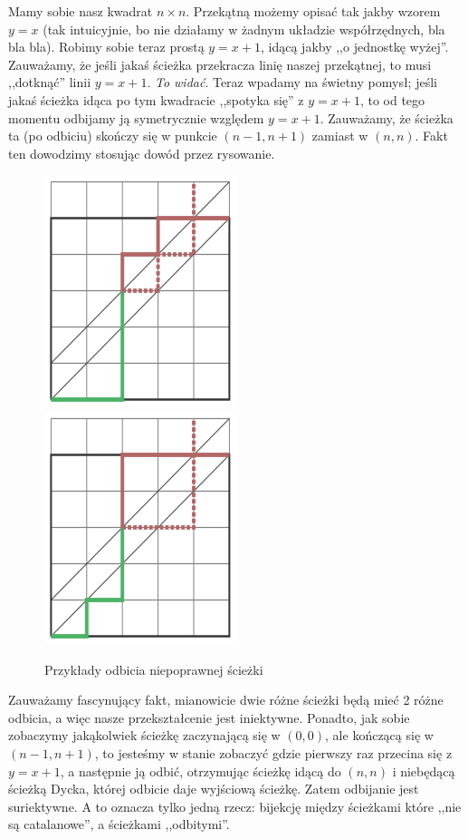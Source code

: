 Mamy sobie nasz kwadrat $n \times n$. Przekątną możemy opisać tak jakby wzorem $y = x$ (tak intuicyjnie, bo nie działamy w żadnym układzie współrzędnych, bla bla bla). Robimy sobie teraz prostą $y = x+1$, idącą jakby ,,o jednostkę wyżej''. Zauważamy, że jeśli jakaś ścieżka przekracza linię naszej przekątnej, to musi ,,dotknąć'' linii $y = x+1$. \textit{To widać}. Teraz wpadamy na świetny pomysł; jeśli jakaś ścieżka idąca po tym kwadracie ,,spotyka się'' z $y = x+1$, to od tego momentu odbijamy ją symetrycznie względem $y = x+1$. Zauważamy, że ścieżka ta (po odbiciu) skończy się w punkcie $(n-1, n+1)$ zamiast w $(n,n)$. Fakt ten dowodzimy stosując dowód przez rysowanie.

\begin{figure}[ht]
	\centering
	\includegraphics[scale=0.5]{images/catalan/path_with_reflection_1.png}
	\includegraphics[scale=0.5]{images/catalan/path_with_reflection_2.png}

	\caption{Przykłady odbicia niepoprawnej ścieżki}
\end{figure}

Zauważamy fascynujący fakt, mianowicie dwie różne ścieżki będą mieć 2 różne odbicia, a więc nasze przekształcenie jest iniektywne. Ponadto, jak sobie zobaczymy jakąkolwiek ścieżkę zaczynającą się w $(0,0)$, ale kończącą się w $(n-1,n+1)$, to jesteśmy w stanie zobaczyć gdzie pierwszy raz przecina się z $y = x+1$, a następnie ją odbić, otrzymując ścieżkę idącą do $(n,n)$ i niebędącą ścieżką Dycka, której odbicie daje wyjściową ścieżkę. Zatem odbijanie jest suriektywne. A to oznacza tylko jedną rzecz: bijekcję między ścieżkami które ,,nie są catalanowe'', a ścieżkami ,,odbitymi''.

